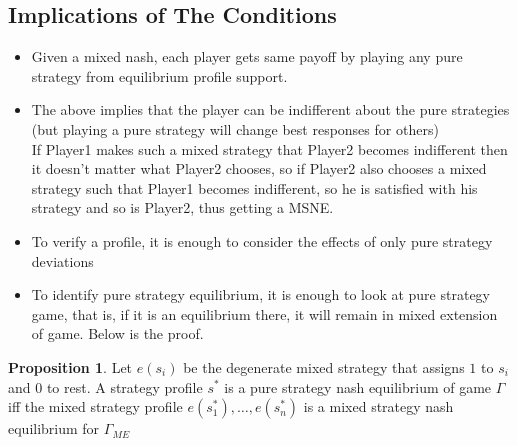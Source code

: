 \documentclass{article}
\theoremstyle{definition}
\newtheorem{prop}{Proposition}[section]
\begin{document}
\subsection{Implications of The Conditions}
\begin{itemize}
	\item Given a mixed nash, each player gets same payoff by playing any pure strategy from equilibrium profile support.
	\item The above implies that the player can be indifferent about the pure strategies (but playing a pure strategy will change best responses for others)\\

	 If Player1 makes such a mixed strategy that Player2 becomes indifferent then it doesn’t matter what Player2 chooses, so if Player2 also chooses a mixed strategy such that Player1 becomes indifferent, so he is satisfied with his strategy and so is Player2, thus getting a MSNE.
	\item To verify a profile, it is enough to consider the effects of only pure strategy deviations
	\item To identify pure strategy equilibrium, it is enough to look at pure strategy game, that is, if it is an equilibrium there, it will remain in mixed extension of game. Below is the proof.
\end{itemize}
\begin{prop}
Let $e(s_i)$ be the degenerate mixed strategy that assigns $1$ to $s_i$ and $0$ to rest. A strategy profile $s^*$ is a pure strategy nash equilibrium of game $\Gamma$ iff the mixed strategy profile $e(s_1^*),\dots ,e(s_n^*)$ is a mixed strategy nash equilibrium for $\Gamma_{ME}$
\end{prop}
\end{document}
